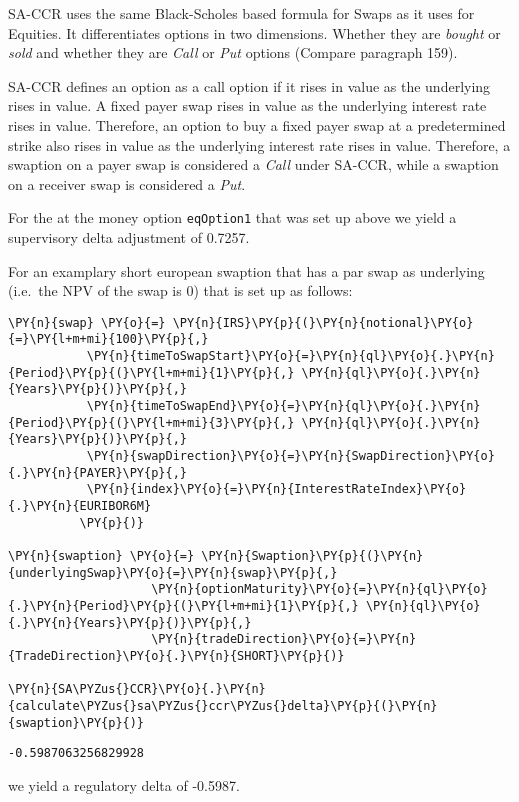 SA-CCR uses the same Black-Scholes based formula for Swaps as it uses
for Equities. It differentiates options in two dimensions. Whether they
are \emph{bought} or \emph{sold} and whether they are \emph{Call} or
\emph{Put} options (Compare paragraph 159).

SA-CCR defines an option as a call option if it rises in value as the
underlying rises in value. A fixed payer swap rises in value as the
underlying interest rate rises in value. Therefore, an option to buy a
fixed payer swap at a predetermined strike also rises in value as the
underlying interest rate rises in value. Therefore, a swaption on a
payer swap is considered a \emph{Call} under SA-CCR, while a swaption on
a receiver swap is considered a \emph{Put}.

    For the at the money option \texttt{eqOption1} that was set up above we
yield a supervisory delta adjustment of 0.7257.

    
    For an examplary short european swaption that has a par swap as
underlying (i.e.~the NPV of the swap is 0) that is set up as follows:

    \begin{tcolorbox}[breakable, size=fbox, boxrule=1pt, pad at break*=1mm,colback=cellbackground, colframe=cellborder]
\begin{Verbatim}[commandchars=\\\{\}]
\PY{n}{swap} \PY{o}{=} \PY{n}{IRS}\PY{p}{(}\PY{n}{notional}\PY{o}{=}\PY{l+m+mi}{100}\PY{p}{,}
           \PY{n}{timeToSwapStart}\PY{o}{=}\PY{n}{ql}\PY{o}{.}\PY{n}{Period}\PY{p}{(}\PY{l+m+mi}{1}\PY{p}{,} \PY{n}{ql}\PY{o}{.}\PY{n}{Years}\PY{p}{)}\PY{p}{,}
           \PY{n}{timeToSwapEnd}\PY{o}{=}\PY{n}{ql}\PY{o}{.}\PY{n}{Period}\PY{p}{(}\PY{l+m+mi}{3}\PY{p}{,} \PY{n}{ql}\PY{o}{.}\PY{n}{Years}\PY{p}{)}\PY{p}{,}
           \PY{n}{swapDirection}\PY{o}{=}\PY{n}{SwapDirection}\PY{o}{.}\PY{n}{PAYER}\PY{p}{,}
           \PY{n}{index}\PY{o}{=}\PY{n}{InterestRateIndex}\PY{o}{.}\PY{n}{EURIBOR6M}
          \PY{p}{)}

\PY{n}{swaption} \PY{o}{=} \PY{n}{Swaption}\PY{p}{(}\PY{n}{underlyingSwap}\PY{o}{=}\PY{n}{swap}\PY{p}{,}
                    \PY{n}{optionMaturity}\PY{o}{=}\PY{n}{ql}\PY{o}{.}\PY{n}{Period}\PY{p}{(}\PY{l+m+mi}{1}\PY{p}{,} \PY{n}{ql}\PY{o}{.}\PY{n}{Years}\PY{p}{)}\PY{p}{,}
                    \PY{n}{tradeDirection}\PY{o}{=}\PY{n}{TradeDirection}\PY{o}{.}\PY{n}{SHORT}\PY{p}{)}

\PY{n}{SA\PYZus{}CCR}\PY{o}{.}\PY{n}{calculate\PYZus{}sa\PYZus{}ccr\PYZus{}delta}\PY{p}{(}\PY{n}{swaption}\PY{p}{)}
\end{Verbatim}
\end{tcolorbox}

            \begin{tcolorbox}[breakable, size=fbox, boxrule=.5pt, pad at break*=1mm, opacityfill=0]
\begin{Verbatim}[commandchars=\\\{\}]
-0.5987063256829928
\end{Verbatim}
\end{tcolorbox}
        
    we yield a regulatory delta of -0.5987.

    

